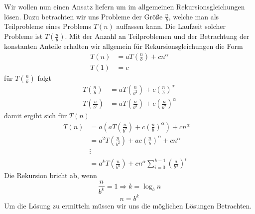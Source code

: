 Wir wollen nun einen Ansatz liefern um im allgemeinen Rekursionsgleichungen lösen.
Dazu betrachten wir uns Probleme der Größe $\frac{n}{b}$, welche man als Teilprobleme eines Problems $T(n)$ auffassen kann.
Die Laufzeit solcher Probleme ist $T\left(\frac{n}{b}\right)$.
Mit der Anzahl an Teilproblemen und der Betrachtung der konstanten Anteile erhalten wir allgemein für Rekursionsgleichungen die Form
\begin{align*}
T(n)&=aT\left(\frac{n}{b}\right)+cn^\alpha\\
T(1)&=c
\end{align*}
für $T\left(\frac{n}{b}\right)$ folgt
\begin{align*}
T\left(\frac{n}{b}\right)&=aT\left(\frac{n}{b^2}\right)+c\left(\frac{n}{b}\right)^\alpha\\
T\left(\frac{n}{b^2}\right)&=aT\left(\frac{n}{b^3}\right)+c\left(\frac{n}{b^2}\right)^\alpha
\end{align*}
damit ergibt sich für $T(n)$
\begin{align*}
T(n)&=a(aT\left(\frac{n}{b^2}\right)+c\left(\frac{n}{b}\right)^\alpha)+cn^\alpha\\
&=a^2T\left(\frac{n}{b^2}\right)+ac\left(\frac{n}{b}\right)^\alpha+cn^\alpha\\
&\vdots&\\
&=a^kT\left(\frac{n}{b^k}\right)+cn^\alpha\sum_{i=0}^{k-1}\left(\frac{a}{b^\alpha}\right)^i
\end{align*}
Die Rekursion bricht ab, wenn
$$\frac{n}{b^k}=1\Rightarrow k=\log_bn$$
$$n=b^k$$
Um die Lösung zu ermitteln müssen wir uns die möglichen Lösungen Betrachten.\\[.5em]
\\[.5em]

